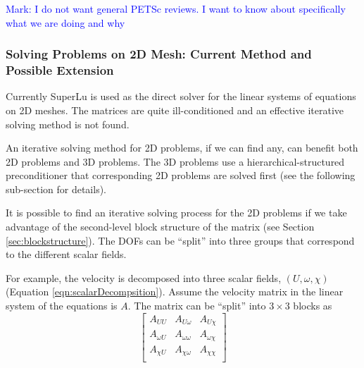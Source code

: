 \documentclass[11pt]{article}  %
\begin{document}

\textcolor{blue}{Mark: I do not want general PETSc reviews. I want to know about specifically what we are doing and why}

\subsubsection{Solving Problems on 2D Mesh: Current Method and Possible Extension} \label{sec:2dproblem}

Currently SuperLu \cite{superlu_ug99}  is used as the direct solver  for the linear systems of equations on 2D meshes. The matrices are quite ill-conditioned and an effective iterative solving method is not found. 

%

An iterative solving method for 2D problems, if we can find any, can benefit both 2D problems and 3D problems. The 3D problems use a hierarchical-structured preconditioner that corresponding 2D problems are solved first (see the following sub-section for details).

It is possible to find an iterative solving process for the 2D problems if we take advantage of the second-level block structure of the matrix (see Section 
\ref{sec:blockstructure}). The DOFs can be ``split'' into three groups that correspond to the different scalar fields.

For example,  the velocity is decomposed into three scalar fields, $(U,\omega, \chi)$ (Equation \ref{eqn:scalarDecompsition}).   Assume the velocity matrix in the linear system of the equations is $A$. The matrix can be ``split''  into $3\times3$ blocks as
\begin{equation}
\left[\begin{array}{ccc}
A_{UU} & A_{U\omega} & A_{U\chi} \\ 
A_{\omega U} & A_{\omega \omega} & A_{\omega \chi} \\ 
A_{\chi U} & A_{\chi\omega} & A_{\chi\chi} \\ 
\end{array} \right]
\nonumber
\end{equation}
\end{document}
